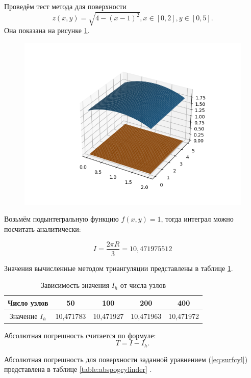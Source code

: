 \documentclass{article}
\begin{document}
Проведём тест метода для поверхности
\begin{equation}\label{eq:surfcyl}
z(x,y) = \sqrt{4-(x-1)^2}, x \in [0,2], y \in [0,5].
\end{equation}
Она показана на рисунке \ref{fig:cylinder}.

\begin{figure}[H]
\centering
\includegraphics[width=0.8\linewidth]{cylinder.png}
\caption[]{}
\label{fig:cylinder}
\end{figure}

Возьмём подынтегральную функцию $f(x,y) = 1$, тогда интеграл можно посчитать аналитически:

\begin{equation}
I = \frac{2 \pi R}{3} = 10,471975512
\end{equation}

Значения вычисленные методом триангуляции представлены в таблице \ref{table:cylinder}.

\begin{table}
\centering
\caption{Зависимость значения $I_h$ от числа узлов\label{table:cylinder}}
\begin{tabular}{|c|c|c|c|c|}
\hline
 Число узлов	& 50		& 100		& 200		& 400		\\ 
\hline
 Значение $I_h$		& 10,471783	& 10,471927	& 10,471963	& 10,471972	\\  
\hline
\end{tabular}
\end{table}

Абсолютная погрешность считается по формуле:
\begin{equation}\label{eq:abs}
T = I-I_h.
\end{equation}

Абсолютная погрешность для поверхности заданной уравнением (\ref{eq:surfcyl}) представлена в таблице \ref{table:abspogcylinder} .
\end{document}
